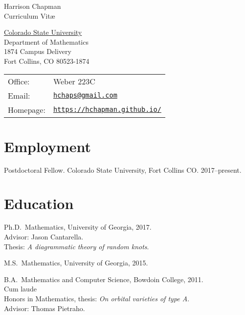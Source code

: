 \documentclass[letterpaper]{article}
\def\name{Harrison Chapman}
\renewenvironment{itemize}{
  \begin{list}{}{
    \setlength{\leftmargin}{1.5em}
  }
}{
  \end{list}
}
\begin{document}
{\huge \name}\\
{\large\sc Curriculum Vit\ae}


\vspace{0.25in}

\begin{minipage}{0.45\linewidth}
  \href{http://www.colostate.edu/}{Colorado State University} \\
  Department of Mathematics \\
  1874 Campus Delivery \\
  Fort Collins, CO 80523-1874
\end{minipage}
\begin{minipage}{0.45\linewidth}
  \begin{tabular}{ll}
    Office: & Weber 223C \\
    Email: & \href{mailto:hchaps@gmail.com}{\tt hchaps@gmail.com} \\
    Homepage: & \href{https://hchapman.github.io/}{\tt https://hchapman.github.io/} \\
  \end{tabular}
\end{minipage}

\section*{Employment}

\begin{itemize}
  \item Postdoctoral Fellow. Colorado State University, Fort Collins CO. 2017--present.
\end{itemize}

\section*{Education}

\begin{itemize}
\item Ph.D.\ Mathematics, University of Georgia, 2017.\\
  \textbullet \quad Advisor: Jason Cantarella.\\
  \textbullet \quad Thesis: \emph{A diagrammatic theory of random knots}.
\item M.S.\ Mathematics, University of Georgia, 2015.
\item B.A.\ Mathematics and Computer Science, Bowdoin College,
  2011.\\
  \textbullet \quad Cum laude \\
  \textbullet \quad Honors in Mathematics, thesis: \emph{On orbital varieties of type A}. \\
  \textbullet \quad Advisor: Thomas Pietraho.
\end{itemize}
\end{document}
